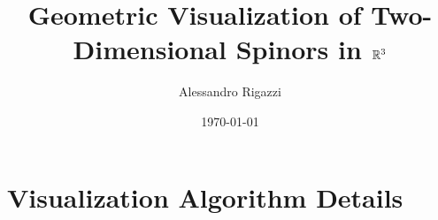 \documentclass[
amsmath,amssymb,aps,
preprint,pra]{revtex4-2}
\begin{document}



\title[Geometric Visualization of Spinors]{Geometric Visualization of Two-Dimensional Spinors in \texorpdfstring{$\mathbb{R}^3$}{R3}}

\author{Alessandro Rigazzi}
%

\date{\today}

\begin{abstract}

\end{abstract}

\maketitle








\appendix

\section{\label{sec-app:pseudocode}Visualization Algorithm Details}



\end{document}
